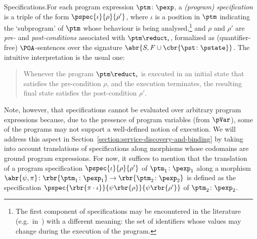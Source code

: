 \documentclass{LMCS}
\begin{document}
\begin{minisection}{Specifications.}For each program expression \(\ptm \colon \pexp\), a \emph{(program) specification} is a triple of the form \(\pspec{\iota}{\rho}{\rho'}\), where \(\iota\) is a position in \(\ptm\) indicating the `subprogram' of \(\ptm\) whose behaviour is being analysed,\footnote{The first component of specifications may be encountered in the literature (e.g.\ in~\cite{Morgan:Programming-from-Specifications-1994}) with a different meaning: the set of identifiers whose values may change during the execution of the program.} and \(\rho\) and \(\rho'\) are \emph{pre-} and \emph{post-conditions} associated with \(\ptm \reduct_{\iota}\), formalized as (quantifier-free) \(\POA\)\nb-sentences over the signature \(\abr{S, F \cup \cbr{\pst \colon \pstate}}\).
  The intuitive interpretation is the usual one: 
  \begin{quotation}
    \noindent Whenever the program \(\ptm \reduct_{\iota}\) is executed in an initial state that satisfies the pre-condition \(\rho\), and the execution terminates, the resulting final state satisfies the post-condition \(\rho'\).
  \end{quotation}
  Note, however, that specifications cannot be evaluated over arbitrary program expressions because, due to the presence of program variables (from \(\pVar\)), some of the programs may not support a well-defined notion of execution.
  We will address this aspect in Section~\ref{section:service-discovery-and-binding} by taking into account translations of specifications along morphisms whose codomains are ground program expressions.
  For now, it suffices to mention that the translation of a program specification \(\pspec{\iota}{\rho}{\rho'}\) of \(\ptm_{1} \colon \pexp_{1}\) along a morphism \(\abr{\psi, \pi} \colon \rbr{\ptm_{1} \colon \pexp_{1}} \to \rbr{\ptm_{2} \colon \pexp_{2}}\) is defined as the specification \(\pspec{\rbr{\pi \cdot \iota}}{\psi\rbr{\rho}}{\psi\rbr{\rho'}}\) of \(\ptm_{2} \colon \pexp_{2}\).
\end{minisection}
\end{document}
